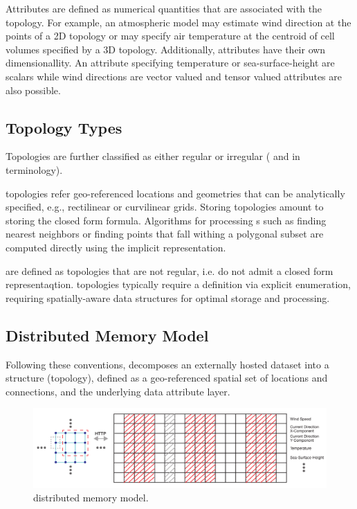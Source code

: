 Attributes are defined as numerical quantities that are associated
with the topology. For example, an atmospheric model may estimate wind
direction at the points of a 2D topology or may specify air
temperature at the centroid of cell volumes specified by a 3D
topology. Additionally, attributes have their  own dimensionallity. An
attribute specifying temperature or sea-surface-height are scalars
while wind directions are vector valued and tensor valued attributes are
also possible.

\subsection{Topology Types}
Topologies are further classified as either regular or irregular
({\bf \cgrid{}} and {\bf \ugrid} in \sciwms{} terminology).

{\bf \cgrid{}} topologies refer geo-referenced locations and geometries that can be analytically specified, e.g., rectilinear
or curvilinear grids. Storing \cgrid{} topologies amount to storing
the closed form formula. Algorithms for processing \cgrid{}s such as
finding nearest neighbors or finding points that fall withing a
polygonal subset are computed directly using the implicit \cgrid{}
representation.

{\bf \ugrid{}} are defined as topologies that are not regular, i.e. do not admit a closed form representaqtion. \ugrid{} topologies typically require a definition via explicit enumeration, requiring spatially-aware data structures for optimal storage and processing.

\subsection{Distributed Memory Model}
Following these conventions, \sciwms{} decomposes an externally hosted
dataset into a structure (topology), defined as a geo-referenced
spatial set of locations and connections, and the underlying data
attribute layer.

\begin{figure}[ht!]
  \centering
  \includegraphics[width=\textwidth]{../figs/topology_memModel}
  \caption{\sciwms{} distributed memory model.}
  \label{fig:sciwms_mem_model}
\end{figure}

